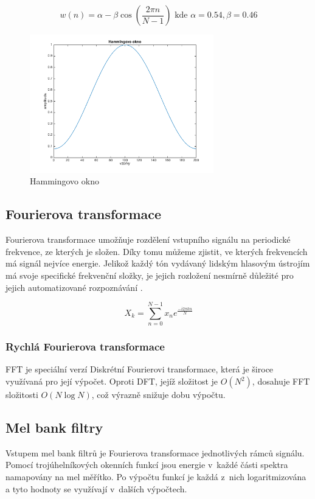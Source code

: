 \begin{equation}
w(n) = \alpha - \beta \cos(\dfrac{2\pi n}{N - 1}) \text{ kde }\alpha = 0.54, \beta = 0.46
\end{equation}

\begin{figure}[H]
	\centering
		\includegraphics[height=6cm]{obrazky-figures/hamming_window.png}
        \caption{Hammingovo okno}
\end{figure}

\subsection{Fourierova transformace}
Fourierova transformace umožňuje rozdělení vstupního signálu na periodické frekvence, ze kterých je složen. Díky tomu můžeme zjistit, ve kterých frekvencích má signál nejvíce energie. Jelikož každý tón vydávaný lidským hlasovým ústrojím má svoje specifické frekvenční složky, je jejich rozložení nesmírně důležité pro jejich automatizované rozpoznávání \cite{9780073039381}.

\begin{equation}
	X_k=\sum_{n=0}^{N-1}x_ne^{\frac{-i2\pi kn}{N}}
\end{equation}

\subsubsection{Rychlá Fourierova transformace}
FFT je speciální verzí Diskrétní Fourierovi transformace, která je široce využívaná pro její výpočet. Oproti DFT, jejíž složitost je $O(N^2)$, dosahuje FFT složitosti $O(N\log N)$, což výrazně snižuje dobu výpočtu.
\subsection{Mel bank filtry}
Vstupem mel bank filtrů je Fourierova transformace jednotlivých rámců signálu. Pomocí trojúhelníkových okenních funkcí jsou energie v~každé části spektra namapovány na mel měřítko. Po výpočtu funkcí je každá z~nich logaritmizována a tyto hodnoty se využívají v~dalších výpočtech.

